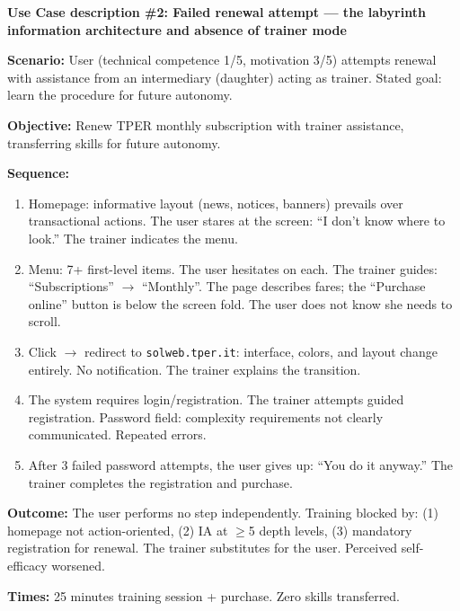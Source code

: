 ﻿\documentclass[11pt,a4paper]{article}
\begin{document}
\vspace{0.3cm}


\begin{tcolorbox}[sectionbox,colback=primaryColor!10]
    \textbf{Use Case description \#2: Failed renewal attempt --- the labyrinth information architecture and absence of trainer mode}
\end{tcolorbox}

\vspace{0.3cm}

\begin{tcolorbox}[base]
    {\small
    \textbf{Scenario:} User (technical competence 1/5, motivation 3/5) attempts renewal with assistance from an intermediary (daughter) acting as trainer. Stated goal: learn the procedure for future autonomy.

    \textbf{Objective:} Renew TPER monthly subscription with trainer assistance, transferring skills for future autonomy.

    \textbf{Sequence:}
    \begin{enumerate}
        \item Homepage: informative layout (news, notices, banners) prevails over transactional actions. The user stares at the screen: ``I don't know where to look.'' The trainer indicates the menu.
        \item Menu: 7+ first-level items. The user hesitates on each. The trainer guides: ``Subscriptions'' $\rightarrow$ ``Monthly''. The page describes fares; the ``Purchase online'' button is below the screen fold. The user does not know she needs to scroll.
        \item Click $\rightarrow$ redirect to \texttt{solweb.tper.it}: interface, colors, and layout change entirely. No notification. The trainer explains the transition.
        \item The system requires login/registration. The trainer attempts guided registration. Password field: complexity requirements not clearly communicated. Repeated errors.
        \item After 3 failed password attempts, the user gives up: ``You do it anyway.'' The trainer completes the registration and purchase.
    \end{enumerate}

    \textbf{Outcome:} The user performs no step independently. Training blocked by: (1) homepage not action-oriented, (2) IA at $\geq$5 depth levels, (3) mandatory registration for renewal. The trainer substitutes for the user. Perceived self-efficacy worsened.

    \textbf{Times:} 25 minutes training session + purchase. Zero skills transferred.
    }
\end{tcolorbox}
\end{document}
